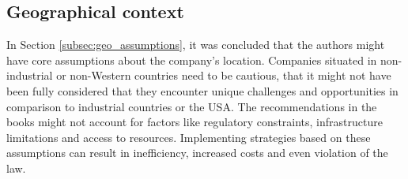 \documentclass[a4]{scrartcl}
\begin{document}
\subsection{Geographical context} \label{subsec:geoconsequences}

In Section \ref{subsec:geo_assumptions}, it was concluded that the authors might have core assumptions about the company's location.
Companies situated in non-industrial or non-Western countries need to be cautious, that it might not have been fully considered that they encounter unique challenges and opportunities in comparison to industrial countries or the USA.
The recommendations in the books might not account for factors like regulatory constraints, infrastructure limitations and access to resources. Implementing strategies based on these assumptions can result in inefficiency, increased costs and even violation of the law.





\end{document}
